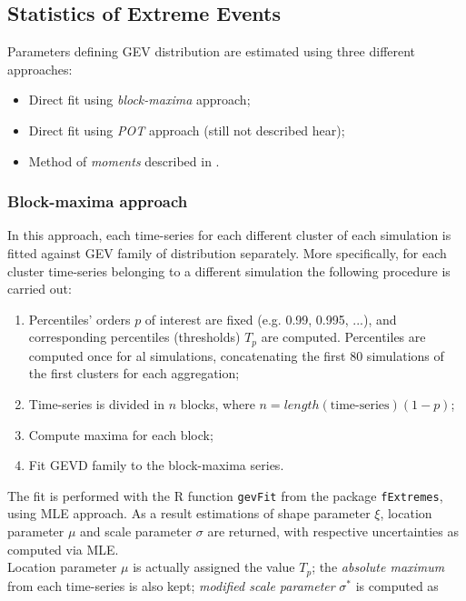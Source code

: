 \documentclass{article}
\begin{document}
\subsection{Statistics of Extreme Events}
\label{subsec:StatExtrEv}

Parameters defining GEV distribution are estimated using three different approaches:

\begin{itemize}
	\item Direct fit using \textit{block-maxima} approach;
	\item Direct fit using \textit{POT} approach (still not described hear);
	\item Method of \textit{moments} described in \cite{LucariniExtremesBook}.
\end{itemize}

\subsubsection{Block-maxima approach}

In this approach, each time-series for each different cluster of each simulation is fitted against GEV family of distribution separately. More specifically, for each cluster time-series belonging to a different simulation the following procedure is carried out:

\begin{enumerate}
	\item Percentiles' orders $p$ of interest are fixed (e.g. 0.99, 0.995, ...), and corresponding percentiles (thresholds) $T_p$ are computed. Percentiles are computed once for al simulations, concatenating the first 80 simulations of the first clusters for each aggregation;
	\item Time-series is divided in $n$ blocks, where $n=length(\text{time-series})(1-p)$;
	\item Compute maxima for each block;
	\item Fit GEVD family to the block-maxima series.
\end{enumerate}

The fit is performed with the R function \texttt{gevFit} from the package \texttt{fExtremes}, using MLE approach. As a result estimations of shape parameter $\xi$, location parameter $\mu$ and scale parameter $\sigma$ are returned, with respective uncertainties as computed via MLE.\\
Location parameter $\mu$ is actually assigned the value $T_p$; the \textit{absolute maximum} from each time-series is also kept; \textit{modified scale parameter} $\sigma^*$ is computed as
\end{document}
